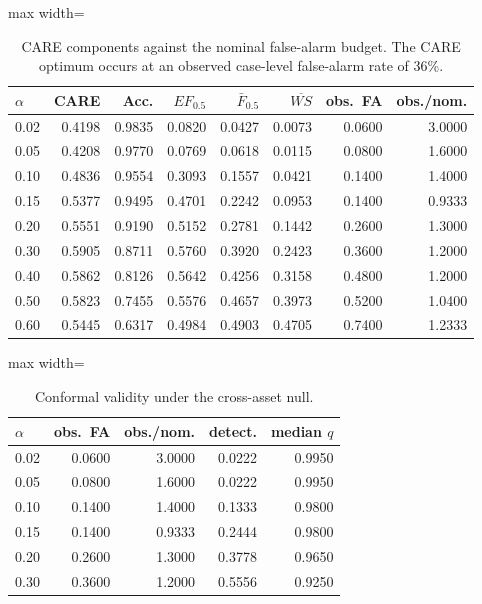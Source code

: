 \documentclass[10pt]{article}
\begin{document}

\begin{table}[htbp]
\centering
\small
\caption{CARE components against the nominal false-alarm budget.
The CARE optimum occurs at an observed case-level false-alarm rate
of 36\%.}
\label{tab:alpha}
\begin{adjustbox}{max width=\textwidth}
\begin{tabular}{lrrrrrrr}
\toprule
$\alpha$
& CARE
& Acc.
& $EF_{0.5}$
& $\bar{F}_{0.5}$
& $\overline{WS}$
& obs.\ FA
& obs./nom. \\
\midrule
0.02
& 0.4198
& 0.9835
& 0.0820
& 0.0427
& 0.0073
& 0.0600
& 3.0000 \\
0.05
& 0.4208
& 0.9770
& 0.0769
& 0.0618
& 0.0115
& 0.0800
& 1.6000 \\
0.10
& 0.4836
& 0.9554
& 0.3093
& 0.1557
& 0.0421
& 0.1400
& 1.4000 \\
0.15
& 0.5377
& 0.9495
& 0.4701
& 0.2242
& 0.0953
& 0.1400
& 0.9333 \\
0.20
& 0.5551
& 0.9190
& 0.5152
& 0.2781
& 0.1442
& 0.2600
& 1.3000 \\
0.30
& 0.5905
& 0.8711
& 0.5760
& 0.3920
& 0.2423
& 0.3600
& 1.2000 \\
0.40
& 0.5862
& 0.8126
& 0.5642
& 0.4256
& 0.3158
& 0.4800
& 1.2000 \\
0.50
& 0.5823
& 0.7455
& 0.5576
& 0.4657
& 0.3973
& 0.5200
& 1.0400 \\
0.60
& 0.5445
& 0.6317
& 0.4984
& 0.4903
& 0.4705
& 0.7400
& 1.2333 \\
\bottomrule
\end{tabular}
\end{adjustbox}
\end{table}


\FloatBarrier


\begin{table}[htbp]
\centering
\small
\caption{Conformal validity under the cross-asset null.}
\label{tab:validity}
\begin{adjustbox}{max width=\textwidth}
\begin{tabular}{lrrrr}
\toprule
$\alpha$
& obs.\ FA
& obs./nom.
& detect.
& median $q$ \\
\midrule
0.02 & 0.0600 & 3.0000 & 0.0222 & 0.9950 \\
0.05 & 0.0800 & 1.6000 & 0.0222 & 0.9950 \\
0.10 & 0.1400 & 1.4000 & 0.1333 & 0.9800 \\
0.15 & 0.1400 & 0.9333 & 0.2444 & 0.9800 \\
0.20 & 0.2600 & 1.3000 & 0.3778 & 0.9650 \\
0.30 & 0.3600 & 1.2000 & 0.5556 & 0.9250 \\
\bottomrule
\end{tabular}
\end{adjustbox}
\end{table}
\end{document}
